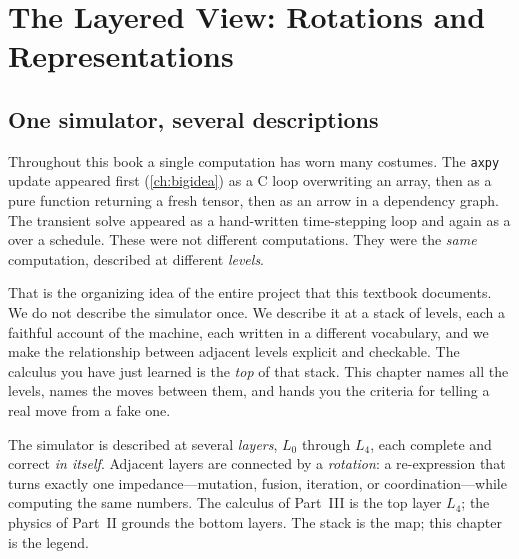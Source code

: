 \chapter{The Layered View: Rotations and Representations}
\label{ch:rotations}


\section{One simulator, several descriptions}

Throughout this book a single computation has worn many costumes. The
\texttt{axpy} update appeared first (\cref{ch:bigidea}) as a C loop overwriting an
array, then as a pure function returning a fresh tensor, then as an arrow in a
dependency graph. The transient solve appeared as a hand-written time-stepping
loop and again as a  over a schedule. These were not different
computations. They were the \emph{same} computation, described at different
\emph{levels}.

That is the organizing idea of the entire project that this textbook documents.
We do not describe the simulator once. We describe it at a stack of levels, each a
faithful account of the machine, each written in a different vocabulary, and we
make the relationship between adjacent levels explicit and checkable. The
calculus you have just learned is the \emph{top} of that stack. This chapter
names all the levels, names the moves between them, and hands you the criteria
for telling a real move from a fake one.

\begin{keyidea}
The simulator is described at several \emph{layers}, $L_0$ through $L_4$, each
complete and correct \emph{in itself}. Adjacent layers are connected by a
\emph{rotation}: a re-expression that turns exactly one impedance---mutation,
fusion, iteration, or coordination---while computing the same numbers. The
calculus of Part~III is the top layer $L_4$; the physics of Part~II grounds the
bottom layers. The stack is the map; this chapter is the legend.
\end{keyidea}

